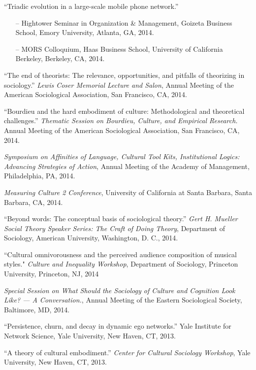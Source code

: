 
\ind ``Triadic evolution in a large-scale mobile phone network.'' 

\begin{itemize}[leftmargin=0.8in, topsep = 0pt]
	\setlength\itemsep{-0.55em}
	\item[--] Hightower Seminar in Organization \& Management, Goizeta Business School, Emory University, Atlanta, GA, 2014.
	\item[--] MORS Colloquium, Haas Business School, University of California Berkeley, Berkeley, CA, 2014. 
\end{itemize}

\ind ``The end of theorists: The relevance, opportunities, and pitfalls of theorizing in sociology.'' \emph{Lewis Coser Memorial Lecture and Salon}, Annual Meeting of the American Sociological Association, San Francisco, CA, 2014.

\ind ``Bourdieu and the hard embodiment of culture: Methodological and theoretical challenges.'' \emph{Thematic Session on Bourdieu, Culture, and Empirical Research.} Annual Meeting of the American Sociological Association, San Francisco, CA, 2014.

\ind \emph{Symposium on Affinities of Language, Cultural Tool Kits, Institutional Logics: Advancing Strategies of Action}, Annual Meeting of the Academy of Management, Philadelphia, PA, 2014.

\ind \emph{Measuring Culture 2 Conference}, University of California at Santa Barbara, Santa Barbara, CA, 2014. 

\ind ``Beyond words: The conceptual basis of sociological theory.'' \emph{Gert H. Mueller Social Theory Speaker Series: The Craft of Doing Theory}, Department of Sociology, American University, Washington, D. C., 2014.

\ind ``Cultural omnivorousness and the perceived audience composition of musical styles." \emph{Culture and Inequality Workshop}, Department of Sociology, Princeton University, Princeton, NJ, 2014

\ind \emph{Special Session on What Should the Sociology of Culture and Cognition Look Like? --- A Conversation.}, Annual Meeting of the Eastern Sociological Society, Baltimore, MD, 2014.

\ind ``Persistence, churn, and decay in dynamic ego networks.'' Yale Institute for Network Science, Yale University, New Haven, CT, 2013.

\ind ``A theory of cultural embodiment.'' \emph{Center for Cultural Sociology Workshop}, Yale University, New Haven, CT, 2013.

